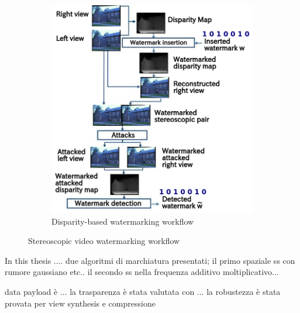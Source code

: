 \begin{figure}[h!]
\begin{subfigure}[]{0.4\textwidth}
\includegraphics[width=1.05\textwidth]{./img/disparity_domain.png}
\caption{\small{Disparity-based watermarking workflow}}
\label{fig:disp}
\end{subfigure}
\caption{\small{Stereoscopic video watermarking workflow}\label{stereo_method}}
\end{figure}







\newpage
In this thesis ....
due algoritmi di marchiatura presentati; il primo spaziale ss con rumore gaussiano etc.. 
il secondo ss nella frequenza additivo moltiplicativo...


data payload è ...
la trasparenza è stata valutata con ...
la robustezza è stata provata per view synthesis e compressione



